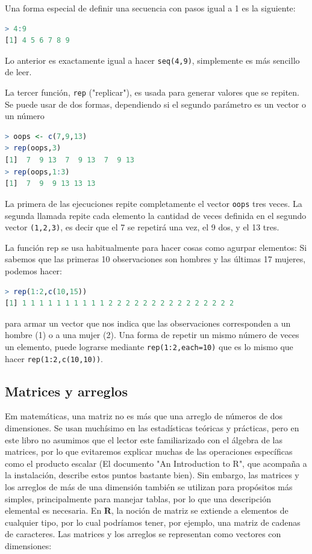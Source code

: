 \documentclass[spanish]{extbook}
\numberwithin{equation}{section}
\numberwithin{figure}{section}
\begin{document}
Una forma especial de definir una secuencia con pasos igual a 1 es la siguiente:

\begin{lstlisting}[language=R]
> 4:9
[1] 4 5 6 7 8 9
\end{lstlisting}

Lo anterior es exactamente igual a hacer \texttt{seq(4,9)}, simplemente es más
sencillo de leer.

La tercer función, \texttt{rep} ("replicar"), es usada para generar valores que
se repiten. Se puede usar de dos formas, dependiendo si el segundo parámetro es
un vector o un número

\begin{lstlisting}[language=R]
> oops <- c(7,9,13)
> rep(oops,3)
[1]  7  9 13  7  9 13  7  9 13
> rep(oops,1:3)
[1]  7  9  9 13 13 13
\end{lstlisting}

La primera de las ejecuciones repite completamente el vector \texttt{oops} tres veces.
La segunda llamada repite cada elemento la cantidad de veces definida en el
segundo vector \texttt{(1,2,3)}, es decir que el 7 se repetirá una vez, el 9 dos, y el
13 tres.

La función rep se usa habitualmente para hacer cosas como agurpar elementos: Si
sabemos que las primeras 10 observaciones son hombres y las últimas 17 mujeres,
podemos hacer:

\begin{lstlisting}[language=R]
> rep(1:2,c(10,15))
[1] 1 1 1 1 1 1 1 1 1 1 2 2 2 2 2 2 2 2 2 2 2 2 2 2 2
\end{lstlisting}

para armar un vector que nos indica que las observaciones corresponden a un
hombre (1) o a una mujer (2).  Una forma de repetir un mismo número de veces un
elemento, puede lograrse mediante \texttt{rep(1:2,each=10)} que es lo mismo que
hacer \texttt{rep(1:2,c(10,10))}.

\subsection{Matrices y arreglos}

Em matemáticas, una matriz no es más que una arreglo de números de dos
dimensiones. Se usan muchísimo en las estadísticas teóricas y prácticas, pero
en este libro no asumimos que el lector este familiarizado con el álgebra de
las matrices, por lo que evitaremos explicar muchas de las operaciones
específicas como el producto escalar (El documento "An Introduction to R", que
acompaña a la instalación, describe estos puntos bastante bien). Sin embargo,
las matrices y los arreglos de más de una dimensión también se utilizan para
propósitos más simples, principalmente para manejar tablas, por lo que una
descripción elemental es necesaria. En \textbf{R}, la noción de matriz se
extiende a elementos de cualquier tipo, por lo cual podríamos tener, por
ejemplo, una matriz de cadenas de caracteres. Las matrices y los arreglos se
representan como vectores con dimensiones:
\end{document}

